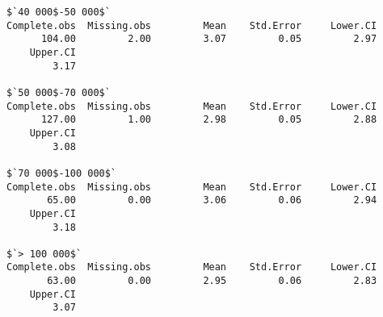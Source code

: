 \documentclass[12pt,a4paper]{article}\usepackage[]{graphicx}\usepackage[]{color}
\makeatletter
\newenvironment{kframe}{%
 \def\at@end@of@kframe{}%
 \ifinner\ifhmode%
  \def\at@end@of@kframe{\end{minipage}}%
  \begin{minipage}{\columnwidth}%
 \fi\fi%
 \def\FrameCommand##1{\hskip\@totalleftmargin \hskip-\fboxsep
 \colorbox{shadecolor}{##1}\hskip-\fboxsep
     \hskip-\linewidth \hskip-\@totalleftmargin \hskip\columnwidth}%
 \MakeFramed {\advance\hsize-\width
   \@totalleftmargin\z@ \linewidth\hsize
   \@setminipage}}%
 {\par\unskip\endMakeFramed%
 \at@end@of@kframe}
\newenvironment{knitrout}{}{} %
\makeatother
\begin{document}
\begin{enumerate}
\begin{knitrout}
\begin{kframe}
\begin{verbatim}
$`40 000$-50 000$`
Complete.obs  Missing.obs         Mean    Std.Error     Lower.CI 
      104.00         2.00         3.07         0.05         2.97 
    Upper.CI 
        3.17 

$`50 000$-70 000$`
Complete.obs  Missing.obs         Mean    Std.Error     Lower.CI 
      127.00         1.00         2.98         0.05         2.88 
    Upper.CI 
        3.08 

$`70 000$-100 000$`
Complete.obs  Missing.obs         Mean    Std.Error     Lower.CI 
       65.00         0.00         3.06         0.06         2.94 
    Upper.CI 
        3.18 

$`> 100 000$`
Complete.obs  Missing.obs         Mean    Std.Error     Lower.CI 
       63.00         0.00         2.95         0.06         2.83 
    Upper.CI 
        3.07 
\end{verbatim}
\end{kframe}
\end{knitrout}
\end{enumerate}
 
\end{document}

